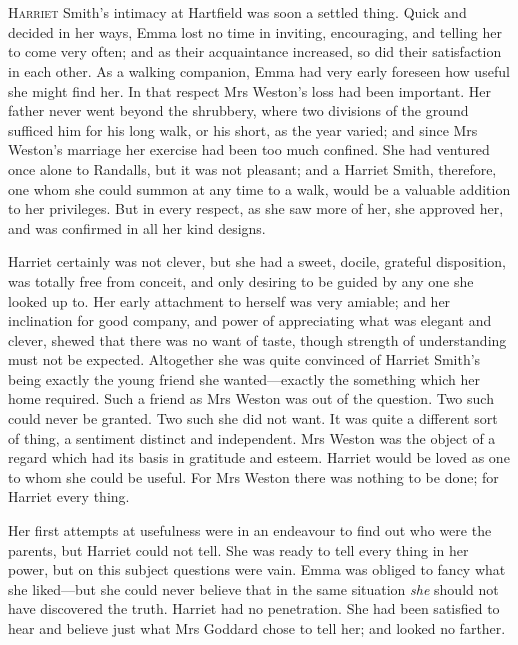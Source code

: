 \chapter[Chapter \thechapter]{}
\lettrine[lines=4,lraise=0.3]{H}{arriet} Smith's intimacy at Hartfield was soon a settled thing. Quick and decided in her ways, Emma lost no time in inviting, encouraging, and telling her to come very often; and as their acquaintance increased, so did their satisfaction in each other. As a walking companion, Emma had very early foreseen how useful she might find her. In that respect Mrs Weston's loss had been important. Her father never went beyond the shrubbery, where two divisions of the ground sufficed him for his long walk, or his short, as the year varied; and since Mrs Weston's marriage her exercise had been too much confined. She had ventured once alone to Randalls, but it was not pleasant; and a Harriet Smith, therefore, one whom she could summon at any time to a walk, would be a valuable addition to her privileges. But in every respect, as she saw more of her, she approved her, and was confirmed in all her kind designs.

Harriet certainly was not clever, but she had a sweet, docile, grateful disposition, was totally free from conceit, and only desiring to be guided by any one she looked up to. Her early attachment to herself was very amiable; and her inclination for good company, and power of appreciating what was elegant and clever, shewed that there was no want of taste, though strength of understanding must not be expected. Altogether she was quite convinced of Harriet Smith's being exactly the young friend she wanted—exactly the something which her home required. Such a friend as Mrs Weston was out of the question. Two such could never be granted. Two such she did not want. It was quite a different sort of thing, a sentiment distinct and independent. Mrs Weston was the object of a regard which had its basis in gratitude and esteem. Harriet would be loved as one to whom she could be useful. For Mrs Weston there was nothing to be done; for Harriet every thing.

Her first attempts at usefulness were in an endeavour to find out who were the parents, but Harriet could not tell. She was ready to tell every thing in her power, but on this subject questions were vain. Emma was obliged to fancy what she liked—but she could never believe that in the same situation \textit{she} should not have discovered the truth. Harriet had no penetration. She had been satisfied to hear and believe just what Mrs Goddard chose to tell her; and looked no farther.

